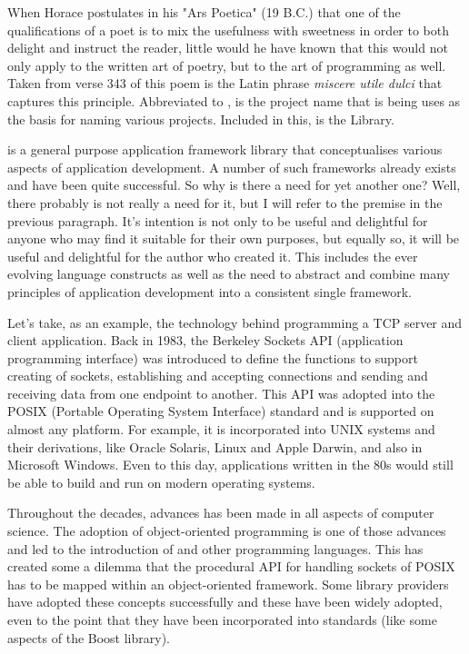 \documentclass[10pt,a4paper,openany]{mudbook}
\begin{document}
When Horace postulates in his "Ars Poetica" (19 B.C.) that one of the
qualifications of a poet is to mix the usefulness with sweetness in order to
both delight and instruct the reader, little would he have known that this
would not only apply to the written art of poetry, but to the art of
programming as well. Taken from verse 343 of this poem is the Latin phrase
\textit{miscere utile dulci} that captures this principle. Abbreviated to \MUD,
is the project name that is being uses as the basis for naming various
projects. Included in this, is the \MUD Library.

\MUDLib is a general purpose application framework library that conceptualises
various aspects of \Cpp application development. A number of such frameworks
already exists and have been quite successful. So why is there a need for yet
another one? Well, there probably is not really a need for it, but I will
refer to the premise in the previous paragraph. It's intention is not only to
be useful and delightful for anyone who may find it suitable for their own
purposes, but equally so, it will be useful and delightful for the author
who created it. This includes the ever evolving \Cpp language constructs as
well as the need to abstract and combine many principles of application
development into a consistent single framework.

Let's take, as an example, the technology behind programming a TCP server and
client application. Back in 1983, the Berkeley Sockets API (application
programming interface) was introduced to define the functions to support
creating of sockets, establishing and accepting connections and sending and
receiving data from one endpoint to another. This API was adopted into the
POSIX (Portable Operating System Interface) standard and is supported on
almost any platform. For example, it is incorporated into UNIX systems and
their derivations, like Oracle Solaris, Linux and Apple Darwin, and also in
Microsoft Windows. Even to this day, applications written in the 80s would
still be able to build and run on modern operating systems.

Throughout the decades, advances has been made in all aspects of computer
science. The adoption of object-oriented programming is one of those advances
and led to the introduction of \Cpp and other programming languages. This has
created some a dilemma that the procedural API for handling sockets of POSIX
has to be mapped within an object-oriented framework. Some library providers
have adopted these concepts successfully and these have been widely adopted,
even to the point that they have been incorporated into \Cpp standards (like
some aspects of the Boost library).
\end{document}
